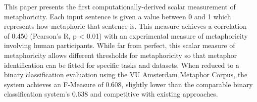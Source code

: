 This paper presents the first computationally-derived scalar measurement of metaphoricity. Each input sentence is given a value between 0 and 1 which represents how metaphoric that sentence is. This measure achieves a correlation of 0.450 (Pearson's R, p < 0.01) with an experimental measure of metaphoricity involving human participants. While far from perfect, this scalar measure of metaphoricity allows different thresholds for metaphoricity so that metaphor identification can be fitted for specific tasks and datasets. When reduced to a binary classification evaluation using the VU Amsterdam Metaphor Corpus, the system achieves an F-Measure of 0.608, slightly lower than the comparable binary classification system's 0.638 and competitive with existing approaches.
